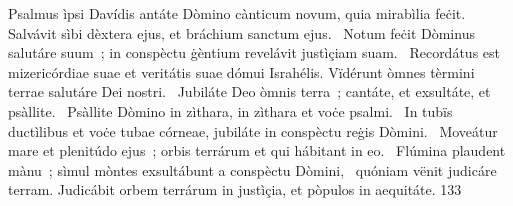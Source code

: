 { Psalmus ìpsi Davídis}
{%
antáte Dòmino cànticum novum, quia mirabìlia feċit. Salvávit sìbi dèxtera ejus, et bráchium sanctum ejus. 
~Notum feċit Dòminus salutáre suum~; in conspèctu ġèntium revelávit justìçiam suam. 
~Recordátus est mizericórdiae suae et veritátis suae dómui Israhélis. Vïdérunt òmnes tèrmini terrae salutáre Dei nostri. 
~Jubiláte Deo òmnis terra~; cantáte, et exsultáte, et psàllite. 
~Psàllite Dòmino in zìthara, in zìthara et voċe psalmi. 
~In tubïs ductìlibus et voċe tubae córneae, jubiláte in conspèctu reġis Dòmini. 
~Moveátur mare et plenitúdo ejus~; orbis terrárum et qui hábitant in eo. 
~Flúmina plaudent mànu~; sìmul mòntes exsultábunt a conspèctu Dòmini, 
~quóniam vënit judicáre terram. Judicábit orbem terrárum in justìçia, et pòpulos in aequitáte. 
}
{13}{3}
